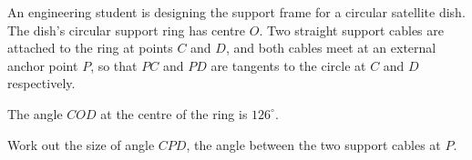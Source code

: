 \begin{question}
\noindent An engineering student is designing the support frame for a circular satellite dish.
The dish's circular support ring has centre $O$. Two straight support cables are attached to the ring at points $C$ and $D$, and both cables meet at an external anchor point $P$, so that $PC$ and $PD$ are tangents to the circle at $C$ and $D$ respectively.

\noindent The angle $COD$ at the centre of the ring is $126^\circ$.

\begin{center}
\end{center}

\noindent Work out the size of angle $CPD$, the angle between the two support cables at $P$.

\vspace{5cm}

\begin{flushright}
\end{flushright}
\end{question}
